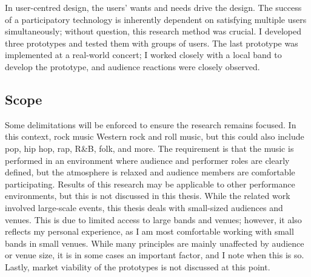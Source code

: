 In user-centred design, the users' wants and needs drive the design. The success of a participatory technology is inherently dependent on satisfying multiple users simultaneously; without question, this research method was crucial. I developed three prototypes and tested them with groups of users. The last prototype was implemented at a real-world concert; I worked closely with a local band to develop the prototype, and audience reactions were closely observed.

\subsection{Scope}

Some delimitations will be enforced to ensure the research remains focused. In this context, rock music Western rock and roll music, but this could also include pop, hip hop, rap, R\&B, folk, and more. The requirement is that the music is performed in an environment where audience and performer roles are clearly defined, but the atmosphere is relaxed and audience members are comfortable participating. Results of this research may be applicable to other performance environments, but this is not discussed in this thesis. While the related work involved large-scale events, this thesis deals with small-sized audiences and venues. This is due to limited access to large bands and venues; however, it also reflects my personal experience, as I am most comfortable working with small bands in small venues. While many principles are mainly unaffected by audience or venue size, it is in some cases an important factor, and I note when this is so. Lastly, market viability of the prototypes is not discussed at this point.

